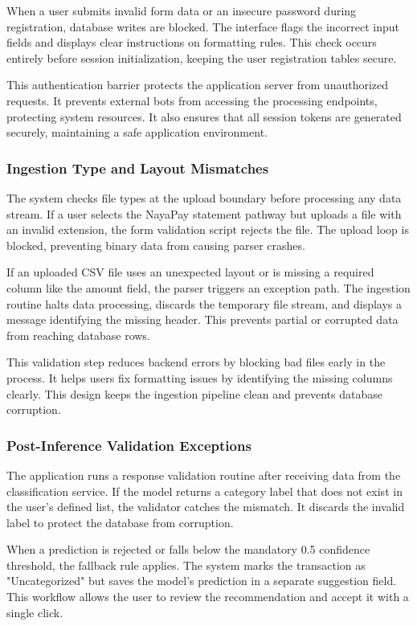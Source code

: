When a user submits invalid form data or an insecure password during registration, database writes are blocked. The interface flags the incorrect input fields and displays clear instructions on formatting rules. This check occurs entirely before session initialization, keeping the user registration tables secure.

This authentication barrier protects the application server from unauthorized requests. It prevents external bots from accessing the processing endpoints, protecting system resources. It also ensures that all session tokens are generated securely, maintaining a safe application environment.

\subsubsection{Ingestion Type and Layout Mismatches}
The system checks file types at the upload boundary before processing any data stream. If a user selects the NayaPay statement pathway but uploads a file with an invalid extension, the form validation script rejects the file. The upload loop is blocked, preventing binary data from causing parser crashes.

If an uploaded CSV file uses an unexpected layout or is missing a required column like the amount field, the parser triggers an exception path. The ingestion routine halts data processing, discards the temporary file stream, and displays a message identifying the missing header. This prevents partial or corrupted data from reaching database rows.

This validation step reduces backend errors by blocking bad files early in the process. It helps users fix formatting issues by identifying the missing columns clearly. This design keeps the ingestion pipeline clean and prevents database corruption.

\subsubsection{Post-Inference Validation Exceptions}
The application runs a response validation routine after receiving data from the classification service. If the model returns a category label that does not exist in the user's defined list, the validator catches the mismatch. It discards the invalid label to protect the database from corruption.

When a prediction is rejected or falls below the mandatory 0.5 confidence threshold, the fallback rule applies. The system marks the transaction as "Uncategorized" but saves the model's prediction in a separate suggestion field. This workflow allows the user to review the recommendation and accept it with a single click.


